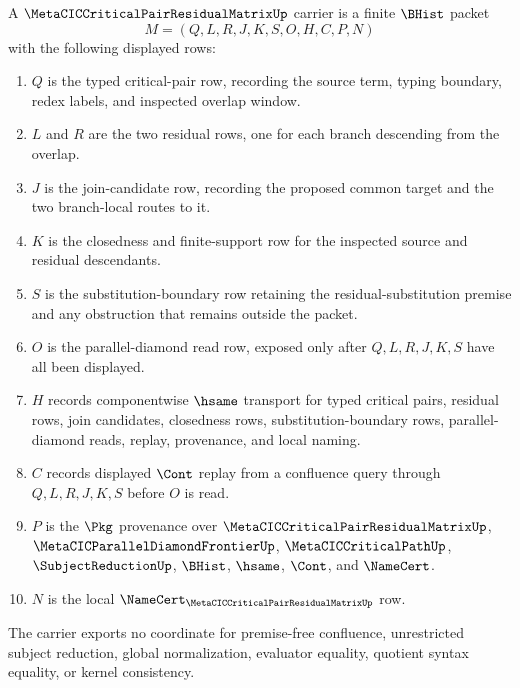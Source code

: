 \begin{definition}
\label{def:metacic-residual-join-frontier-carrier}
A $\MetaCICCriticalPairResidualMatrixUp$ carrier is a finite $\BHist$ packet
$$
M=(Q,L,R,J,K,S,O,H,C,P,N)
$$
with the following displayed rows:
\begin{enumerate}
\item $Q$ is the typed critical-pair row, recording the source term, typing boundary, redex labels, and inspected overlap window.
\item $L$ and $R$ are the two residual rows, one for each branch descending from the overlap.
\item $J$ is the join-candidate row, recording the proposed common target and the two branch-local routes to it.
\item $K$ is the closedness and finite-support row for the inspected source and residual descendants.
\item $S$ is the substitution-boundary row retaining the residual-substitution premise and any obstruction that remains outside the packet.
\item $O$ is the parallel-diamond read row, exposed only after $Q,L,R,J,K,S$ have all been displayed.
\item $H$ records componentwise $\hsame$ transport for typed critical pairs, residual rows, join candidates, closedness rows, substitution-boundary rows, parallel-diamond reads, replay, provenance, and local naming.
\item $C$ records displayed $\Cont$ replay from a confluence query through $Q,L,R,J,K,S$ before $O$ is read.
\item $P$ is the $\Pkg$ provenance over $\MetaCICCriticalPairResidualMatrixUp$, $\MetaCICParallelDiamondFrontierUp$, $\MetaCICCriticalPathUp$, $\SubjectReductionUp$, $\BHist$, $\hsame$, $\Cont$, and $\NameCert$.
\item $N$ is the local $\NameCert_{\MetaCICCriticalPairResidualMatrixUp}$ row.
\end{enumerate}
The carrier exports no coordinate for premise-free confluence, unrestricted subject reduction, global normalization, evaluator equality, quotient syntax equality, or kernel consistency.
\end{definition}

